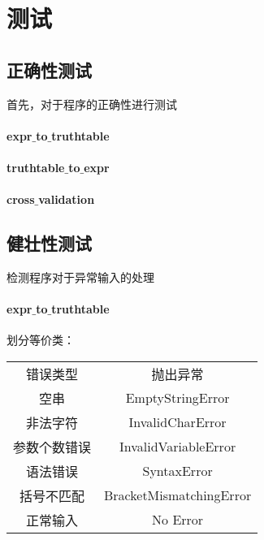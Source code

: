 \section{测试}

\subsection{正确性测试}
	首先，对于程序的正确性进行测试
	
	\paragraph{expr$\_$to$\_$truthtable\\}
		
	\paragraph{truthtable$\_$to$\_$expr\\}
			
	\paragraph{cross$\_$validation\\}
			
\subsection{健壮性测试}
	检测程序对于异常输入的处理	
	\paragraph{expr$\_$to$\_$truthtable\\}
		划分等价类：
		\begin{center}
			\begin{tabular}{cc}
				错误类型 & 抛出异常\\
				空串 & EmptyStringError\\
				非法字符 & InvalidCharError\\
				参数个数错误 & InvalidVariableError\\
				语法错误 & SyntaxError\\
				括号不匹配 & BracketMismatchingError\\
				正常输入 & No Error\\
		\end{tabular}				
		\end{center}

		
